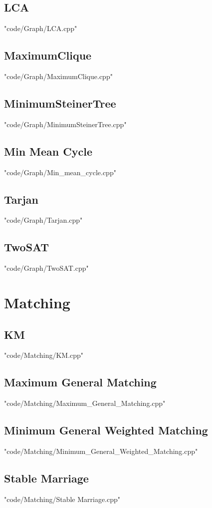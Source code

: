 \documentclass[landscape, 8pt,twocolumn,oneside, a4paper]{article}
\begin{document}
\subsection{LCA}
 {"code/Graph/LCA.cpp"}
\subsection{MaximumClique}
 {"code/Graph/MaximumClique.cpp"}
\subsection{MinimumSteinerTree}
 {"code/Graph/MinimumSteinerTree.cpp"}
\subsection{Min Mean Cycle}
 {"code/Graph/Min_mean_cycle.cpp"}
\subsection{Tarjan}
 {"code/Graph/Tarjan.cpp"}
\subsection{TwoSAT}
 {"code/Graph/TwoSAT.cpp"}
\section{Matching}
\subsection{KM}
 {"code/Matching/KM.cpp"}
\subsection{Maximum General Matching}
 {"code/Matching/Maximum_General_Matching.cpp"}
\subsection{Minimum General Weighted Matching}
 {"code/Matching/Minimum_General_Weighted_Matching.cpp"}
\subsection{Stable Marriage}
 {"code/Matching/Stable Marriage.cpp"}
\end{document}
